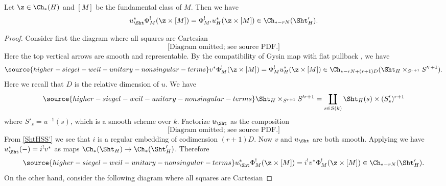 \begin{prop}
\notready\label{p:base change}  Let $\z\in \Ch_{*}(H)$ and $[M]$ be the fundamental class of $M$. Then we have
\begin{equation}
u_{\Sht}^{*}\Phi_{M}^{!}(\z \times [M])=\Phi_{M'}^{!}u_{H}^{*}(\z \times [M])\in\Ch_{*-rN}(\Sht'_{H}).
\end{equation}
\end{prop}
\begin{proof}
Consider first the diagram where all squares are Cartesian
\begin{equation}
\text{[Diagram omitted; see source PDF.]}
\end{equation}
Here the top vertical arrows are smooth and representable. By the compatibility of  Gysin map with flat pullback \cite[Theorem 2.1.12(ix)]{Kr99}, we have
\begin{equation}\label{vPhiu}
\source{higher-siegel-weil-unitary-nonsingular-terms}
v^{*}\Phi_{M}^{!}(\z \times [M])=\Phi_{M}^{!}u_{H}^{*}(\z \times [M])\in \Ch_{*-rN+(r+1)D}(\Sht_{H}\times_{S^{r+1}}S'^{r+1}).
\end{equation}
Here we recall that $D$ is the relative dimension of $u$.
We have
\begin{equation}\label{ShtHSS'}
\source{higher-siegel-weil-unitary-nonsingular-terms}
\Sht_{H}\times_{S^{r+1}}S'^{r+1}=\coprod_{s\in S(k)}\Sht_{H}(s)\times (S'_{s})^{r+1}
\end{equation}
where $S'_{s}=u^{-1}(s)$, which is a smooth scheme over $k$. Factorize $u_{\Sht}$ as the composition
\begin{equation}
\text{[Diagram omitted; see source PDF.]}
\end{equation}
From \eqref{ShtHSS'} we see that $i$ is a regular embedding of codimension $(r+1)D$. Now $v$ and $u_{\Sht}$ are both smooth. Applying \cite[Theorem 2.1.12(ix)]{Kr99} we have $u^{*}_{\Sht}(-)=i^{!}v^{*}$ as maps $\Ch_{*}(\Sht_{H})\to \Ch_*(\Sht'_{H})$. Therefore
\begin{equation}\label{iuPhi}
\source{higher-siegel-weil-unitary-nonsingular-terms}
u_{\Sht}^{*}\Phi_{M}^{!}(\z \times [M])=i^{!}v^{*}\Phi_{M}^{!}(\z \times [M])\in \Ch_{*-rN}(\Sht_{H}').
\end{equation}
On the other hand, consider the following diagram where all squares are Cartesian

\end{proof}

